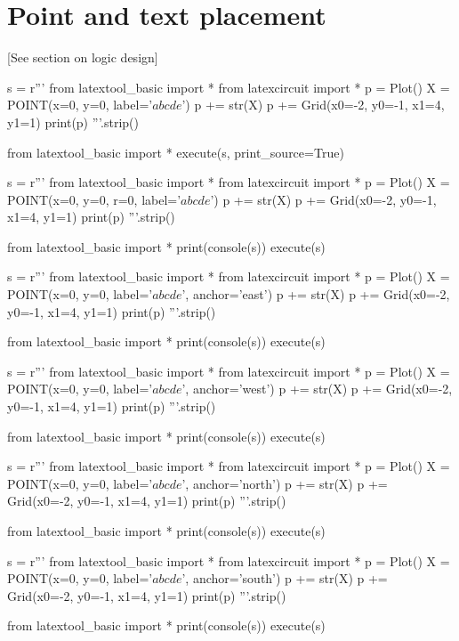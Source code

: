 \section{Point and text placement}

[See section on logic design]

\begin{python}
s = r'''
from latextool_basic import *
from latexcircuit import *
p = Plot()
X = POINT(x=0, y=0, label='$abcde$')
p += str(X)
p += Grid(x0=-2, y0=-1, x1=4, y1=1)
print(p)
'''.strip()

from latextool_basic import *
execute(s, print_source=True)
\end{python}

\newpage
\begin{python}
s = r'''
from latextool_basic import *
from latexcircuit import *
p = Plot()
X = POINT(x=0, y=0, r=0, label='$abcde$')
p += str(X)
p += Grid(x0=-2, y0=-1, x1=4, y1=1)
print(p)
'''.strip()

from latextool_basic import *
print(console(s))
execute(s)
\end{python}

\begin{python}
s = r'''
from latextool_basic import *
from latexcircuit import *
p = Plot()
X = POINT(x=0, y=0, label='$abcde$', anchor='east')
p += str(X)
p += Grid(x0=-2, y0=-1, x1=4, y1=1)
print(p)
'''.strip()

from latextool_basic import *
print(console(s))
execute(s)
\end{python}

\begin{python}
s = r'''
from latextool_basic import *
from latexcircuit import *
p = Plot()
X = POINT(x=0, y=0, label='$abcde$', anchor='west')
p += str(X)
p += Grid(x0=-2, y0=-1, x1=4, y1=1)
print(p)
'''.strip()

from latextool_basic import *
print(console(s))
execute(s)
\end{python}

\begin{python}
s = r'''
from latextool_basic import *
from latexcircuit import *
p = Plot()
X = POINT(x=0, y=0, label='$abcde$', anchor='north')
p += str(X)
p += Grid(x0=-2, y0=-1, x1=4, y1=1)
print(p)
'''.strip()

from latextool_basic import *
print(console(s))
execute(s)
\end{python}


\begin{python}
s = r'''
from latextool_basic import *
from latexcircuit import *
p = Plot()
X = POINT(x=0, y=0, label='$abcde$', anchor='south')
p += str(X)
p += Grid(x0=-2, y0=-1, x1=4, y1=1)
print(p)
'''.strip()

from latextool_basic import *
print(console(s))
execute(s)
\end{python}

